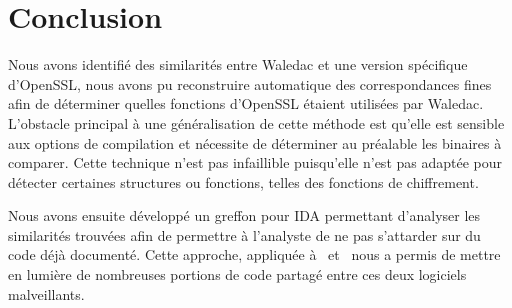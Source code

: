\section{Conclusion}
Nous avons identifié des similarités entre Waledac et une version spécifique d'OpenSSL, nous avons pu reconstruire automatique des correspondances fines afin de déterminer quelles fonctions d'OpenSSL étaient utilisées par Waledac.
L'obstacle principal à une généralisation de cette méthode est qu'elle est sensible aux options de compilation et nécessite de déterminer au préalable les binaires à comparer.
Cette technique n'est pas infaillible puisqu'elle n'est pas adaptée pour détecter certaines structures ou fonctions, telles des fonctions de chiffrement.

Nous avons ensuite développé un greffon pour IDA permettant d'analyser les similarités trouvées afin de permettre à l'analyste de ne pas s'attarder sur du code déjà documenté.
Cette approche, appliquée à \duqu\ et \stux\ nous a permis de mettre en lumière de nombreuses portions de code partagé entre ces deux logiciels malveillants.